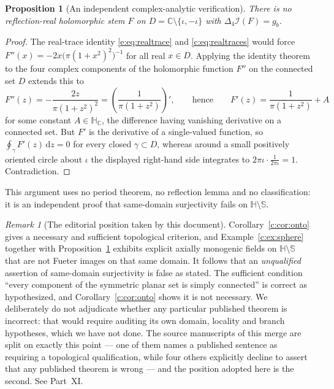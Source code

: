 \documentclass[11pt,a4paper]{article}
\numberwithin{equation}{section}
\newtheorem{proposition}[theorem]{Proposition}
\theoremstyle{definition}
\theoremstyle{remark}
\newtheorem{remark}[theorem]{Remark}
\theoremstyle{plain}
\newcommand{\HH}{\mathbb H}
\newcommand{\HC}{\mathbb H_{\mathbb C}}
\newcommand{\CC}{\mathbb C}
\newcommand{\SSS}{\mathbb S}
\newcommand{\lap}{\Delta_4}
\newcommand{\I}{\mathcal I}
\newcommand{\dd}{\mathrm d}
\begin{document}
\begin{proposition}[An independent complex-analytic verification]
\label{c:prop:complexcheck}
There is no reflection-real holomorphic stem $F$ on
$D=\CC\setminus\{\iota,-\iota\}$ with $\lap\I(F)=g_b$.
\end{proposition}

\begin{proof}
The real-trace identity \eqref{e:eq:realtrace} and
\eqref{c:eq:realtraces} would force
$F''(x)=-2x\bigl(\pi(1+x^{2})^{2}\bigr)^{-1}$ for all real $x\in D$.
Applying the identity theorem to the four complex components of the
holomorphic function $F''$ on the connected set $D$ extends this to
\[
  F''(z)=-\frac{2z}{\pi(1+z^{2})^{2}}
   =\left(\frac1{\pi(1+z^{2})}\right)',
  \qquad\text{hence}\qquad
  F'(z)=\frac1{\pi(1+z^{2})}+A
\]
for some constant $A\in\HC$, the difference having vanishing derivative
on a connected set.  But $F'$ is the derivative of a single-valued
function, so $\oint_\gamma F'(z)\,\dd z=0$ for every closed
$\gamma\subset D$, whereas around a small positively oriented circle
about $\iota$ the displayed right-hand side integrates to
$2\pi\iota\cdot\frac1{2\pi\iota}=1$.  Contradiction.
\end{proof}

This argument uses no period theorem, no reflection lemma and no
classification: it is an independent proof that same-domain surjectivity
fails on $\HH\setminus\SSS$.

\begin{remark}[The editorial position taken by this document]
\label{c:rem:editorial}
Corollary~\ref{c:cor:onto} gives a necessary and sufficient topological
criterion, and Example~\ref{c:ex:sphere} together with
Proposition~\ref{c:prop:complexcheck} exhibits explicit axially monogenic
fields on $\HH\setminus\SSS$ that are not Fueter images on that same
domain.  It follows that an \emph{unqualified} assertion of same-domain
surjectivity is false as stated.  The sufficient condition ``every
component of the symmetric planar set is simply connected'' is correct as
hypothesized, and Corollary~\ref{c:cor:onto} shows it is not necessary.
We deliberately do not adjudicate whether any particular published
theorem is incorrect: that would require auditing its own domain,
locality and branch hypotheses, which we have not done.  The source
manuscripts of this merge are split on exactly this point — one of them
names a published sentence as requiring a topological qualification,
while four others explicitly decline to assert that any published
theorem is wrong — and the position adopted here is the second.  See
Part~XI.
\end{remark}
\end{document}
